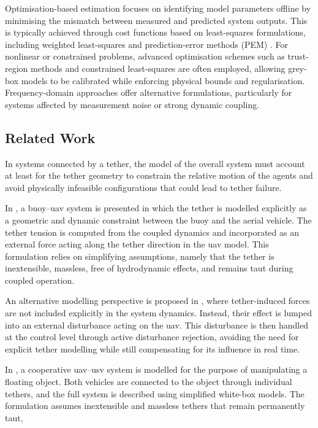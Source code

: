 Optimisation-based estimation focuses on identifying model parameters offline by minimising the mismatch between measured and predicted system outputs. 
This is typically achieved through cost functions based on least-squares formulations, including weighted least-squares and prediction-error methods (PEM) 
\cite{tangirala2013principles}. 
For nonlinear or constrained problems, advanced optimisation schemes such as trust-region methods and constrained least-squares are often employed, 
allowing grey-box models to be calibrated while enforcing physical bounds and regularisation. 
Frequency-domain approaches offer alternative formulations, particularly for systems affected by measurement noise or strong dynamic coupling.



\subsection{Related Work}

In systems connected by a tether, the model of the overall system must account at least for the tether geometry to constrain the relative motion of the agents and avoid physically infeasible configurations that could lead to tether failure.

In \cite{kouraniMarineLocomotionTethered2021}, a buoy--\gls{uav} system is presented in which the tether is modelled explicitly as a geometric and dynamic constraint between the buoy and the aerial vehicle. The tether tension is computed from the coupled dynamics and incorporated as an external force acting along the tether direction in the \gls{uav} model. This formulation relies on simplifying assumptions, namely that the tether is inextensible, massless, free of hydrodynamic effects, and remains taut during coupled operation.

An alternative modelling perspective is proposed in \cite{yuReducedComplexityActiveDisturbance2023}, where tether-induced forces are not included explicitly in the system dynamics. Instead, their effect is lumped into an external disturbance acting on the \gls{uav}. This disturbance is then handled at the control level through active disturbance rejection, avoiding the need for explicit tether modelling while still compensating for its influence in real time.

In \cite{novakCollaborativeObjectManipulation2024}, a cooperative \gls{uav}--\gls{usv} system is modelled for the purpose of manipulating a floating object. Both vehicles are connected to the object through individual tethers, and the full system is described using simplified white-box models. The formulation assumes inextensible and massless tethers that remain permanently taut,

